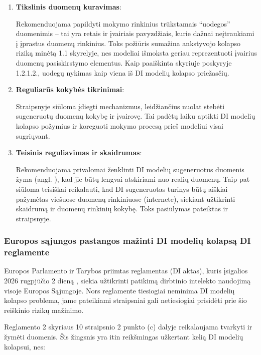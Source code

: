 \documentclass{VUMIFInfKursinis}
\begin{document}
\begin{enumerate}
    \item \textbf{Tikslinis duomenų kuravimas}:
    
        Rekomenduojama papildyti mokymo rinkinius trūkstamais \enquote{uodegos} duomenimis – tai yra retais ir įvairiais pavyzdžiais, kurie dažnai neįtraukiami į įprastus duomenų rinkinius.
        Toks požiūris sumažina ankstyvojo kolapso riziką minėtą 1.1 skyrelyje, nes modeliai išmoksta geriau reprezentuoti įvairius duomenų pasiskirstymo elementus. Kaip paaiškinta skyriuje poskyryje 1.2.1.2., uodegų nykimas kaip viena iš DI modelių kolapso priežasčių.
   

    \item \textbf{Reguliarūs kokybės tikrinimai}:
    
        Straipsnyje siūloma įdiegti mechanizmus, leidžiančius nuolat stebėti sugeneruotų duomenų kokybę ir įvairovę. Tai padėtų laiku aptikti DI modelių kolapso požymius ir koreguoti mokymo procesą prieš modeliui visai sugriųvant.
    

    \item \textbf{Teisinis reguliavimas ir skaidrumas}:
    
         Rekomenduojama privalomai ženklinti DI modelių sugeneruotus duomenis žyma (angl. ), kad jie būtų lengvai atskiriami nuo realių duomenų. Taip pat siūloma teisiškai reikalauti, kad DI sugeneruotas turinys būtų aiškiai pažymėtas viešuose duomenų rinkiniuose (internete), siekiant užtikrinti skaidrumą ir duomenų rinkinių kokybę. Toks pasiūlymas pateiktas ir \cite{ModelsGoMAD} straipsnyje. 
    
\end{enumerate}


\subsubsection{Europos sąjungos pastangos mažinti DI modelių kolapsą DI reglamente}

Europos Parlamento ir Tarybos priimtas reglamentas (DI aktas), kuris įsigalios 2026 rugpjūčio 2 dieną \cite{AIEuropeanAct}, siekia užtikrinti patikimą dirbtinio intelekto naudojimą visoje Europos Sąjungoje. Nors reglamente tiesiogiai neminima DI modelių kolapso problema, jame pateikiami straipsniai gali netiesiogiai prisidėti prie šio reiškinio rizikų mažinimo. 

Reglamento 2 skyriaus 10 straipsnio 2 punkto (c) dalyje reikalaujama tvarkyti ir žymėti duomenis. Šis žingsnis yra itin reikšmingas užkertant kelią DI modelių kolapsui, nes:
\end{document}
